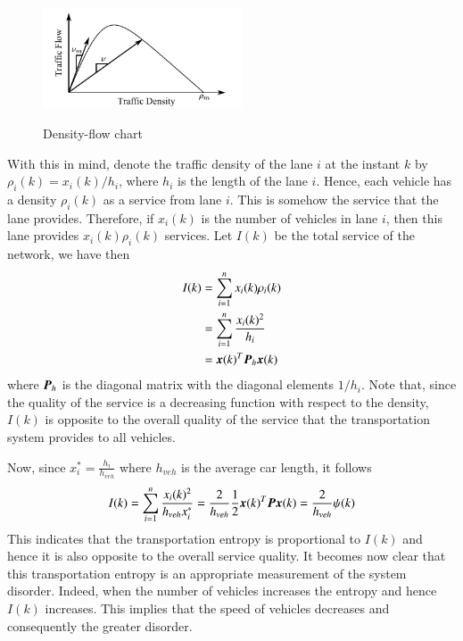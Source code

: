 \documentclass[preprint,authoryear,12pt]{elsarticle}
\renewcommand{\vec}[1]{\mbox{\boldmath$#1$}}
\newcommand{\mat}[1]{\mbox{\boldmath$#1$}}
\begin{document}
\begin{figure}[ht]
  \centering
  \includegraphics[height=3cm]{pics/d-q}\\
  \caption{Density-flow chart}
  \label{fig:d_q}
\end{figure}

With this in mind, denote the traffic density of the lane $i$ at the
instant $k$ by $\rho_i(k)=x_i(k)/h_i$, where $h_i$ is the length of
the lane $i$. Hence, each vehicle has a density $\rho_i(k)$ as a
service from lane $i$. This is somehow the service that the lane 
provides. Therefore, if $x_i(k)$ is the number of vehicles in lane
$i$, then this lane provides $x_i(k)\rho_i(k)$ services.
Let $I(k)$ be the total service of the network, we have then
\begin{equation}
\label{equ:quality_service}
\begin{split}
I(k)&=\sum_{i=1}^{n} x_i(k)\rho_i(k)\\
&=\sum_{i=1}^{n}\frac{x_i(k)^2}{h_i}\\
&=\vec{x}(k)^T\mat{P}_h\vec{x}(k)
\end{split}
\end{equation}
where $\mat{P}_h$ is the diagonal matrix with the diagonal elements
$1/h_i$. Note that, since the quality of the service is a decreasing 
function with respect to the density, $I(k)$ is opposite to the
overall quality of the service that the transportation system provides
to all vehicles.

Now, since $x_i^*=\frac{h_i}{h_{veh}}$ where $h_{veh}$ is the average
car length, it follows
\begin{equation}
I(k) = \sum_{i=1}^{n}\frac{x_i(k)^2}{h_{veh} x_i^*}
= \frac{2}{h_{veh}} \frac{1}{2}\vec{x}(k)^T\mat{P}\vec{x}(k)
= \frac{2}{h_{veh}} \psi(k)
\end{equation}
This indicates that the transportation entropy is proportional to
$I(k)$ and hence it is also opposite to the overall service quality. It
becomes now clear that this transportation entropy is an appropriate
measurement of the system disorder. Indeed, when the number of
vehicles increases the entropy and hence $I(k)$ increases. This
implies that the speed of vehicles decreases and consequently the
greater disorder.
\end{document}
